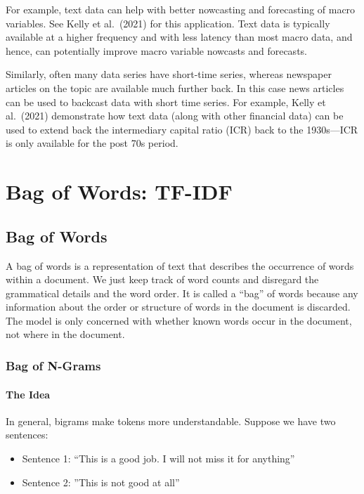 \documentclass[
]{book}
\providecommand{\tightlist}{%
  \setlength{\itemsep}{0pt}\setlength{\parskip}{0pt}}
\begin{document}
For example, text data can help with better nowcasting and forecasting of macro variables. See Kelly et al.~(2021) for this application. Text data is typically available at a higher frequency and with less latency than most macro data, and hence, can potentially improve macro variable nowcasts and forecasts.

Similarly, often many data series have short-time series, whereas newspaper articles on the topic are available much further back. In this case news articles can be used to backcast data with short time series. For example, Kelly et al.~(2021) demonstrate how text data (along with other financial data) can be used to extend back the intermediary capital ratio (ICR) back to the 1930s---ICR is only available for the post 70s period.

\hypertarget{bag-of-words-tf-idf}{%
\chapter{Bag of Words: TF-IDF}\label{bag-of-words-tf-idf}}

\hypertarget{bag-of-words}{%
\section{Bag of Words}\label{bag-of-words}}

A bag of words is a representation of text that describes the occurrence of words within a document. We just keep track of word counts and disregard the grammatical details and the word order. It is called a ``bag'' of words because any information about the order or structure of words in the document is discarded. The model is only concerned with whether known words occur in the document, not where in the document.

\hypertarget{bag-of-n-grams}{%
\subsection{Bag of N-Grams}\label{bag-of-n-grams}}

\hypertarget{the-idea}{%
\subsubsection{The Idea}\label{the-idea}}

In general, bigrams make tokens more understandable. Suppose we have two sentences:

\begin{itemize}
\tightlist
\item
  Sentence 1: ``This is a good job. I will not miss it for anything''
\item
  Sentence 2: ''This is not good at all''
\end{itemize}
\end{document}
